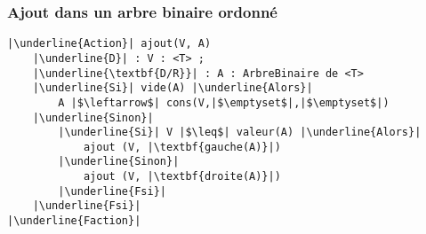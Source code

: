 \documentclass[table,handout,tikz,12pt,svgnames]{beamer}
\begin{document}
\begin{frame}[fragile=singleslide]
	\frametitle{Ajout dans un arbre binaire ordonné}
	\vspace{-0.1cm}
	\begin{verbatim}
|\underline{Action}| ajout(V, A)
	|\underline{D}| : V : <T> ; 
	|\underline{\textbf{D/R}}| : A : ArbreBinaire de <T>
	|\underline{Si}| vide(A) |\underline{Alors}|
		A |$\leftarrow$| cons(V,|$\emptyset$|,|$\emptyset$|)
	|\underline{Sinon}|
		|\underline{Si}| V |$\leq$| valeur(A) |\underline{Alors}|
			ajout (V, |\textbf{gauche(A)}|)
		|\underline{Sinon}|
			ajout (V, |\textbf{droite(A)}|)
		|\underline{Fsi}|
	|\underline{Fsi}|
|\underline{Faction}|
	\end{verbatim}
\end{frame}
\end{document}
